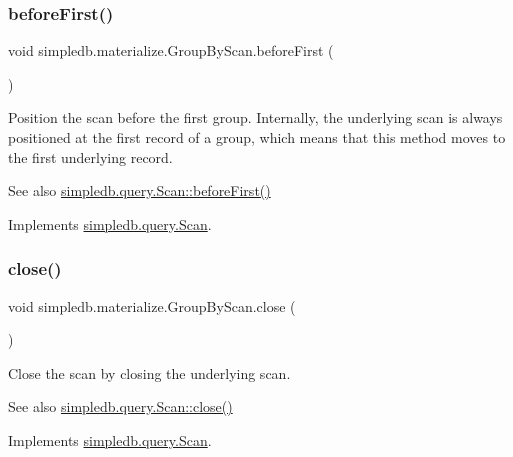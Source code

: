 \subsubsection{\texorpdfstring{before\+First()}{beforeFirst()}}
{\footnotesize\ttfamily void simpledb.\+materialize.\+Group\+By\+Scan.\+before\+First (\begin{DoxyParamCaption}{ }\end{DoxyParamCaption})\hspace{0.3cm}{\ttfamily [inline]}}

Position the scan before the first group. Internally, the underlying scan is always positioned at the first record of a group, which means that this method moves to the first underlying record. \begin{DoxySeeAlso}{See also}
\hyperlink{interfacesimpledb_1_1query_1_1Scan_a2eceb634b69da9bf1269a4355808cc6b}{simpledb.\+query.\+Scan\+::before\+First()} 
\end{DoxySeeAlso}


Implements \hyperlink{interfacesimpledb_1_1query_1_1Scan_a2eceb634b69da9bf1269a4355808cc6b}{simpledb.\+query.\+Scan}.

\mbox{\label{classsimpledb_1_1materialize_1_1GroupByScan_a95a307d14faf60c967efaaa666d22bf0}} 
\subsubsection{\texorpdfstring{close()}{close()}}
{\footnotesize\ttfamily void simpledb.\+materialize.\+Group\+By\+Scan.\+close (\begin{DoxyParamCaption}{ }\end{DoxyParamCaption})\hspace{0.3cm}{\ttfamily [inline]}}

Close the scan by closing the underlying scan. \begin{DoxySeeAlso}{See also}
\hyperlink{interfacesimpledb_1_1query_1_1Scan_a260f40a8c82edaa00398bea9d698933c}{simpledb.\+query.\+Scan\+::close()} 
\end{DoxySeeAlso}


Implements \hyperlink{interfacesimpledb_1_1query_1_1Scan_a260f40a8c82edaa00398bea9d698933c}{simpledb.\+query.\+Scan}.

